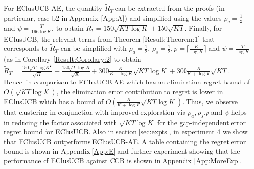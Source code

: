 For EClusUCB-AE, the quantity $\widetilde R_T$ can be extracted from the proofs (in particular, case b2 in Appendix \ref{App:A}) and simplified using the values $\rho_{a}=\frac{1}{2}$ and $\psi=\frac{T}{196 \log K}$, to obtain $\widetilde R_T = 150\sqrt{KT\log K}+150\sqrt{KT}$. 
Finally, for EClusUCB, the relevant terms from Theorem \ref{Result:Theorem:1} that corresponds to $\widetilde R_T$ can be simplified with $\rho_{a}=\frac{1}{2}$, $\rho_{s}=\frac{1}{2},p=\big\lceil \frac{K}{\log K} \big\rceil$ and $\psi=\frac{T}{\log K}$ (as in Corollary \ref{Result:Corollary:2} to obtain  
$\tilde R_T = \frac{150 \sqrt{T}\log K^{\frac{3}{2}} }{\sqrt{K}} + \frac{150 \sqrt{T}\log K}{\sqrt{K}} + 300 \frac{K}{K+\log K}\sqrt{KT\log K} + 300 \frac{K}{K+\log K}\sqrt{KT}$. Hence, in comparison to EClusUCB-AE which has an elimination regret bound of $O(\sqrt{KT\log K})$, the elimination error contribution to regret is lower in EClusUCB which has a bound of $O(\frac{K}{K+\log K}\sqrt{KT\log K})$. Thus, we observe that clustering in conjunction with improved exploration via $\rho_{a},\rho_{s}$,$p$ and $\psi$ helps in reducing the factor associated with $\sqrt{KT\log K}$ for the gap-independent error regret bound for EClusUCB. Also in section \ref{sec:expts}, in experiment $4$ we show that EClusUCB outperforms EClusUCB-AE. A table containing the regret error bound is shown in Appendix \ref{App:E} and further experiment showing that the performance of EClusUCB against CCB\cite{liu2016modification} is shown in Appendix \ref{App:MoreExp}.
